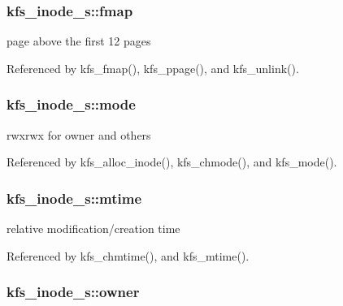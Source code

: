 \hypertarget{structkfs__inode__s_a6a491f8ad9c0ea78d30421be44931e9b}{
\subsubsection[{fmap}]{ kfs\-\_\-inode\-\_\-s\-::fmap}}\label{structkfs__inode__s_a6a491f8ad9c0ea78d30421be44931e9b}


page above the first 12 pages 



Referenced by kfs\-\_\-fmap(), kfs\-\_\-ppage(), and kfs\-\_\-unlink().

\hypertarget{structkfs__inode__s_af0dd6151a1aba841d36f2d005e77aef4}{
\subsubsection[{mode}]{ kfs\-\_\-inode\-\_\-s\-::mode}}\label{structkfs__inode__s_af0dd6151a1aba841d36f2d005e77aef4}


rwxrwx for owner and others 



Referenced by kfs\-\_\-alloc\-\_\-inode(), kfs\-\_\-chmode(), and kfs\-\_\-mode().

\hypertarget{structkfs__inode__s_a575e296191f8d2444a26f90d58e155e6}{
\subsubsection[{mtime}]{ kfs\-\_\-inode\-\_\-s\-::mtime}}\label{structkfs__inode__s_a575e296191f8d2444a26f90d58e155e6}


relative modification/creation time 



Referenced by kfs\-\_\-chmtime(), and kfs\-\_\-mtime().

\hypertarget{structkfs__inode__s_adecb12117172ae213c9d659ffbcd809b}{
\subsubsection[{owner}]{ kfs\-\_\-inode\-\_\-s\-::owner}}\label{structkfs__inode__s_adecb12117172ae213c9d659ffbcd809b}


